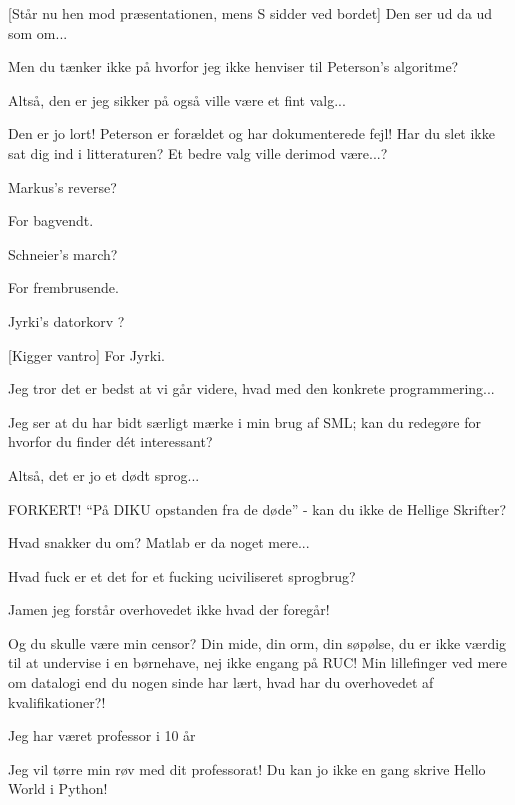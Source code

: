\documentclass[a4paper,11pt]{article}
\begin{document}
\begin{sketch}
[Står nu hen mod præsentationen, mens S sidder ved bordet] Den
ser ud da ud som om...

 Men du tænker ikke på hvorfor jeg ikke henviser til
Peterson's algoritme?

 Altså, den er jeg sikker på også ville være et fint valg...

 Den er jo lort!  Peterson er forældet og har dokumenterede
fejl!  Har du slet ikke sat dig ind i litteraturen?  Et bedre valg
ville derimod være...?

 Markus's reverse?

 For bagvendt.

 Schneier's march?

 For frembrusende.

 Jyrki's datorkorv ?

[Kigger vantro] For Jyrki.

 Jeg tror det er bedst at vi går videre, hvad med den konkrete
programmering...


 Jeg ser at du har bidt særligt mærke i min brug af SML; kan
du redegøre for hvorfor du finder dét interessant?

 Altså, det er jo et dødt sprog...

 FORKERT! ``På DIKU opstanden fra de døde'' - kan du ikke de
Hellige Skrifter?


 Hvad snakker du om?  Matlab er da noget mere...

 Hvad fuck er et det for et fucking uciviliseret sprogbrug?

 Jamen jeg forstår overhovedet ikke hvad der foregår!


 Og du skulle være min censor?  Din mide, din orm, din
søpølse, du er ikke værdig til at undervise i en børnehave, nej ikke
engang på RUC! Min lillefinger ved mere om datalogi end du nogen sinde
har lært, hvad har du overhovedet af kvalifikationer?!

 Jeg har været professor i 10 år

 Jeg vil tørre min røv med dit professorat!  Du kan jo ikke en
gang skrive Hello World i Python!


\end{sketch}
\end{document}
